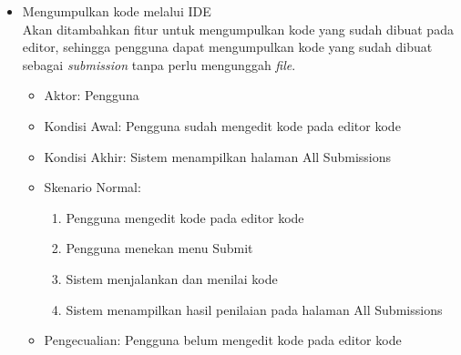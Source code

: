 \begin{itemize}
    
    \item Mengumpulkan kode melalui IDE \\  Akan ditambahkan fitur untuk mengumpulkan kode yang sudah dibuat pada editor, sehingga pengguna dapat mengumpulkan kode yang sudah dibuat sebagai \textit{submission} tanpa perlu mengunggah \textit{file}.
        \begin{itemize}
            \item Aktor: Pengguna
            \item Kondisi Awal: Pengguna sudah mengedit kode pada editor kode
            \item Kondisi Akhir: Sistem menampilkan halaman All Submissions
            \item Skenario Normal:
                \begin{enumerate}
                    \item Pengguna mengedit kode pada editor kode
                    \item Pengguna menekan menu Submit
                    \item Sistem menjalankan dan menilai kode
                    \item Sistem menampilkan hasil penilaian pada halaman All Submissions 
                \end{enumerate}
            \item Pengecualian:  Pengguna belum mengedit kode pada editor kode
        \end{itemize}
\end{itemize}